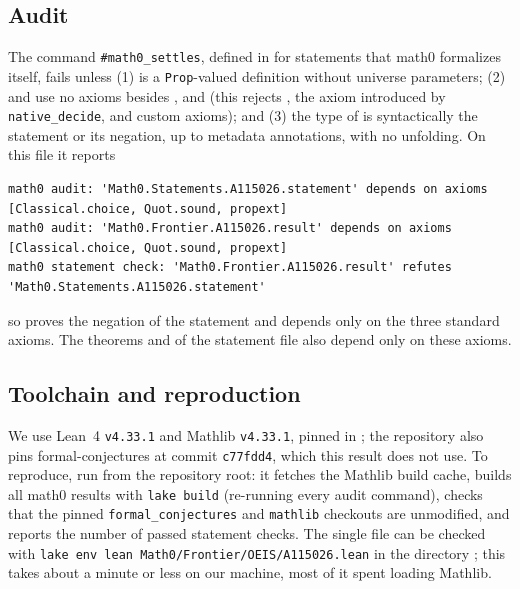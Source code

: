 \documentclass[11pt]{amsart}
\theoremstyle{plain}
\theoremstyle{definition}
\begin{document}
\subsection*{Audit}
The command \texttt{\#math0\_settles}, defined in  for statements that math0 formalizes itself, fails unless (1)  is a \texttt{Prop}-valued definition without universe parameters; (2)  and  use no axioms besides ,  and  (this rejects , the axiom  introduced by \texttt{native\_decide}, and custom axioms); and (3) the type of  is syntactically the statement or its negation, up to metadata annotations, with no unfolding. On this file it reports
\begin{lstlisting}[basicstyle=\ttfamily\scriptsize]
math0 audit: 'Math0.Statements.A115026.statement' depends on axioms [Classical.choice, Quot.sound, propext]
math0 audit: 'Math0.Frontier.A115026.result' depends on axioms [Classical.choice, Quot.sound, propext]
math0 statement check: 'Math0.Frontier.A115026.result' refutes 'Math0.Statements.A115026.statement'
\end{lstlisting}
so  proves the negation of the statement and depends only on the three standard axioms. The theorems  and  of the statement file also depend only on these axioms.

\subsection*{Toolchain and reproduction}
We use Lean~4 \cite{Lean4} \texttt{v4.33.1} and Mathlib \cite{Mathlib} \texttt{v4.33.1}, pinned in ; the repository also pins formal-conjectures \cite{FC} at commit \texttt{c77fdd4}, which this result does not use.
To reproduce, run  from the repository root: it fetches the Mathlib build cache, builds all math0 results with \texttt{lake build} (re-running every audit command), checks that the pinned \texttt{formal\_conjectures} and \texttt{mathlib} checkouts are unmodified, and reports the number of passed statement checks. The single file can be checked with \texttt{lake env lean Math0/Frontier/OEIS/A115026.lean} in the directory ; this takes about a minute or less on our machine, most of it spent loading Mathlib.
\end{document}
